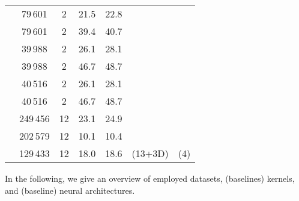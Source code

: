 \documentclass{article}
\theoremstyle{definition}
\newcommand{\cmark}{\ding{51}}\newcommand{\xmark}{\ding{55}}
\begin{document}
\begin{table}[h]
\begin{center}
{\begin{tabular}{@{}lcccccc@{}}
				       &   79\,601&	2&	21.5&	22.8                & \cmark  & \cmark           \\
				       &  79\,601&	2&	39.4&	40.7                  & \cmark  & \cmark           \\
				       &      39\,988&	2&	26.1&	28.1                      & \cmark  & \cmark           \\
				       &  39\,988&	2&	46.7&	48.7      & \cmark  & \cmark           \\
				       &      	40\,516&	2&	26.1&	28.1             & \cmark  & \cmark           \\
				       &        40\,516	&2&	46.7&	48.7              & \cmark  & \cmark           \\
				\midrule        
				       &  249\,456 &12	&23.1 &	24.9     & \cmark  & \cmark           \\
				       & 202\,579 &12	& 10.1 &	10.4 	     & \cmark  & \cmark           \\
				       &129\,433  &12	& 18.0 &	18.6     & \cmark (13+3D)  & \cmark (4)          \\
				\bottomrule
		\end{tabular}}
		\label{ds}
	\end{center}
\end{table}

In the following, we give an overview of employed datasets, (baselines) kernels, and (baseline) neural architectures. 
\end{document}
